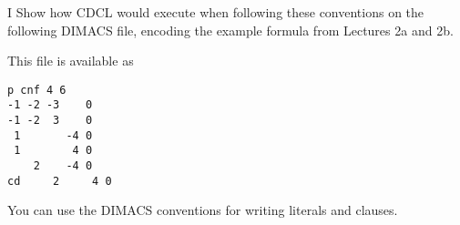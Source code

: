 \snewpage

\begin{problem}{I}
  Show how CDCL would execute when following these conventions on the following
  DIMACS file, encoding the example formula from Lectures 2a and 2b.

  This file is available as   
  \begin{lstlisting}
p cnf 4 6
-1 -2 -3    0
-1 -2  3    0
 1       -4 0
 1        4 0
    2    -4 0
cd     2     4 0
  \end{lstlisting}
  You can use the DIMACS conventions for writing literals and clauses.
  
\end{problem}

\snewpage

